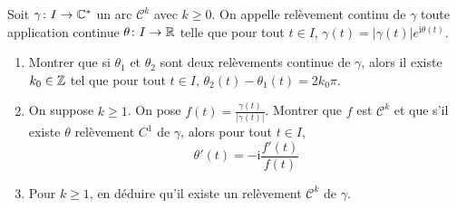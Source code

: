 \begin{exercise}
	Soit $\gamma\colon I\to\mathbb{C}^{*}$ un arc $\mathcal{C}^{k}$ avec $k\geqslant0$. On appelle relèvement continu de $\gamma$ toute application continue $\theta\colon I\to\mathbb{R}$ telle que pour tout $t\in I$, $\gamma(t)=\vert\gamma(t)\vert e^{\mathrm{i}\theta(t)}$.
	\begin{enumerate}
		\item Montrer que si $\theta_{1}$ et $\theta_{2}$ sont deux relèvements continue de $\gamma$, alors il existe $k_{0}\in\mathbb{Z}$ tel que pour tout $t\in I$, $\theta_{2}(t)-\theta_{1}(t)=2k_{0}\pi$.
		\item On suppose $k\geqslant1$. On pose $f(t)=\frac{\gamma(t)}{\vert\gamma(t)\vert}$. Montrer que $f$ est $\mathcal{C}^{k}$ et que s'il existe $\theta$ relèvement $C^{1}$ de $\gamma$, alors pour tout $t\in I$, 
		$$\theta'(t)=-\mathrm{i}\frac{f'(t)}{f(t)}$$
		\item Pour $k\geqslant1$, en déduire qu'il existe un relèvement $\mathcal{C}^{k}$ de $\gamma$.
	\end{enumerate}
\end{exercise}